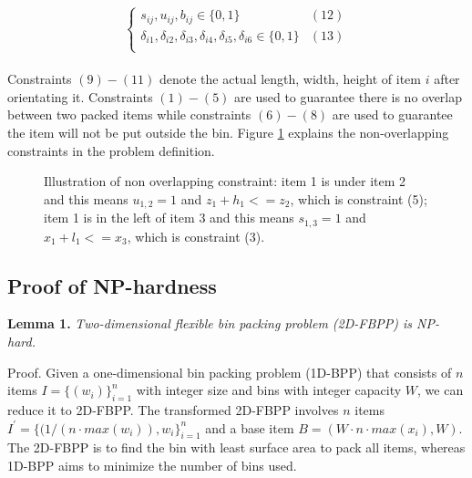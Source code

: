 \begin{eqnarray*}
\begin{split}
\begin{cases}
			s_{ij} , u_{ij},  b_{ij}  \in \{0,1\}                                                                                                                      & (12)\\%
			{\delta}_{i1}, {\delta}_{i2}, {\delta}_{i3}, {\delta}_{i4}, {\delta}_{i5}, {\delta}_{i6} \in \{0,1\}                                                     &(13)\\
		\end{cases}
	\end{split}
\end{eqnarray*}

Constraints $(9)-(11)$ denote the actual length, width, height of item $i$ after orientating it. Constraints $(1)-(5)$ are used to guarantee there is no overlap between two packed items while constraints $(6)-(8)$ are used to guarantee the item will not be put outside the bin. Figure \ref{fig:problem-illu} explains the non-overlapping constraints in the problem definition.

\begin{figure}[h]
	\centering
	\caption{Illustration of non overlapping constraint: item 1 is under item 2 and this means $u_{1,2}=1$ and $z_1 + h_1 <= z_2$, which is constraint (5); item 1 is in the left of item 3 and this means $s_{1,3}=1$ and $x_1 + l_1 <= x_3$, which is constraint (3). }
	\label{fig:problem-illu}
	\vspace{-15pt}
\end{figure}
\subsection{Proof of NP-hardness}

\textbf{Lemma 1.} \textit{Two-dimensional flexible bin packing problem (2D-FBPP) is NP-hard.}

\hspace{-1em}Proof. Given a one-dimensional bin packing problem (1D-BPP) that consists of $n$ items $I=\{(w_i)\}_{i=1}^{n}$ with integer size and bins with integer capacity $W$, we can reduce it to 2D-FBPP. The transformed 2D-FBPP involves $n$ items $I^{'}=\{(1/(n \cdot max({w_i})),w_i\}_{i=1}^{n}$ and a base item $B=(W \cdot n \cdot max(x_i),W)$. The 2D-FBPP is to find the bin with least surface area to pack all items, whereas 1D-BPP aims to minimize the number of bins used.  


